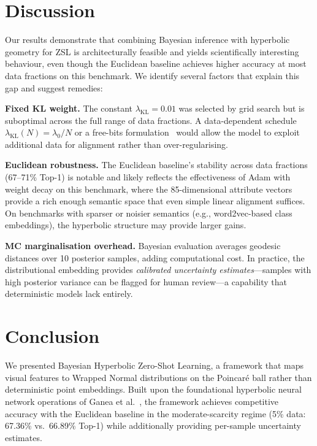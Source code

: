 \documentclass{article}
\DeclareMathOperator{\KL}{KL}
\begin{document}
\section{Discussion}\label{sec:discussion}

Our results demonstrate that combining Bayesian inference with hyperbolic geometry for ZSL is architecturally feasible and yields scientifically interesting behaviour, even though the Euclidean baseline achieves higher accuracy at most data fractions on this benchmark.
We identify several factors that explain this gap and suggest remedies:

\textbf{Fixed KL weight.}
The constant $\lambda_{\KL} = 0.01$ was selected by grid search but is suboptimal across the full range of data fractions.
A data-dependent schedule $\lambda_{\KL}(N) = \lambda_0 / N$ or a free-bits formulation~\cite{kingma2016improved} would allow the model to exploit additional data for alignment rather than over-regularising.

\textbf{Euclidean robustness.}
The Euclidean baseline's stability across data fractions (67--71\% Top-1) is notable and likely reflects the effectiveness of Adam with weight decay on this benchmark, where the 85-dimensional attribute vectors provide a rich enough semantic space that even simple linear alignment suffices.
On benchmarks with sparser or noisier semantics (e.g., word2vec-based class embeddings), the hyperbolic structure may provide larger gains.

\textbf{MC marginalisation overhead.}
Bayesian evaluation averages geodesic distances over 10 posterior samples, adding computational cost.
In practice, the distributional embedding provides \emph{calibrated uncertainty estimates}---samples with high posterior variance can be flagged for human review---a capability that deterministic models lack entirely.

\section{Conclusion}\label{sec:conclusion}

We presented Bayesian Hyperbolic Zero-Shot Learning, a framework that maps visual features to Wrapped Normal distributions on the Poincar\'{e} ball rather than deterministic point embeddings.
Built upon the foundational hyperbolic neural network operations of Ganea et al.~\cite{ganea2018hyperbolic}, the framework achieves competitive accuracy with the Euclidean baseline in the moderate-scarcity regime (5\% data: 67.36\% vs.\ 66.89\% Top-1) while additionally providing per-sample uncertainty estimates.
\end{document}

